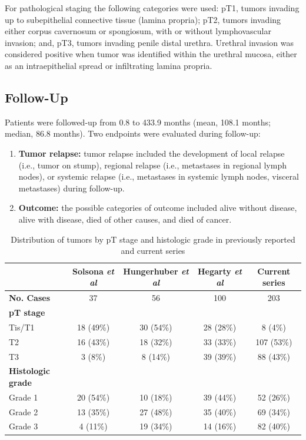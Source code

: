 \documentclass[11pt,letterpaper]{article}\usepackage[]{graphicx}\usepackage[]{color}
\begin{document}
\begin{multicols}{2}
For pathological staging the following categories were used: pT1, tumors invading up to subepithelial connective tissue (lamina propria); pT2, tumors invading either corpus cavernosum or spongiosum, with or without lymphovascular invasion; and, pT3, tumors invading penile distal urethra. Urethral invasion was considered positive when tumor was identified within the urethral mucosa, either as an intraepithelial spread or infiltrating lamina propria.

\subsection*{Follow-Up}
Patients were followed-up from 0.8 to 433.9 months (mean, 108.1 months; median, 86.8 months). Two endpoints were evaluated during follow-up:
\begin{enumerate}
        \item \textbf{Tumor relapse:} tumor relapse included the development of local relapse (i.e., tumor on stump), regional relapse (i.e., metastases in regional lymph nodes), or systemic relapse (i.e., metastases in systemic lymph nodes, visceral metastases) during follow-up.
        \item \textbf{Outcome:} the possible categories of outcome included alive without disease, alive with disease, died of other causes, and died of cancer.
\end{enumerate}

\begin{table}
\centering
        \caption{Distribution of tumors by pT stage and histologic grade in previously reported and current series}
        \label{Distribution_Table}
\begin{tabular}{lcccc}
\hline 
\ & Solsona \emph{et al} & Hungerhuber \emph{et al} & Hegarty \emph{et al} & Current series \\
\hline
\textbf{No. Cases} & 37 & 56 & 100 & 203 \\
\textbf{pT stage} & \ & \ & \ & \ \\
        \hspace{2ex}Tis/T1    & 18 (49\%)   & 30 (54\%)   & 28 (28\%)   & 8 (4\%) \\
        \hspace{2ex}T2        & 16 (43\%)   & 18 (32\%)   & 33 (33\%)   & 107 (53\%) \\
        \hspace{2ex}T3        & 3 (8\%)     & 8 (14\%)    & 39 (39\%)   & 88 (43\%) \\
\textbf{Histologic grade } & \ & \ & \ & \ \\
        \hspace{2ex}Grade 1   & 20 (54\%)   & 10 (18\%)   & 39 (44\%)   & 52 (26\%) \\
        \hspace{2ex}Grade 2   & 13 (35\%)   & 27 (48\%)   & 35 (40\%)   & 69 (34\%) \\
        \hspace{2ex}Grade 3   & 4 (11\%)    & 19 (34\%)   & 14 (16\%)   & 82 (40\%) \\
\hline 
\end{tabular}
\end{table}


\end{multicols}
\end{document}
